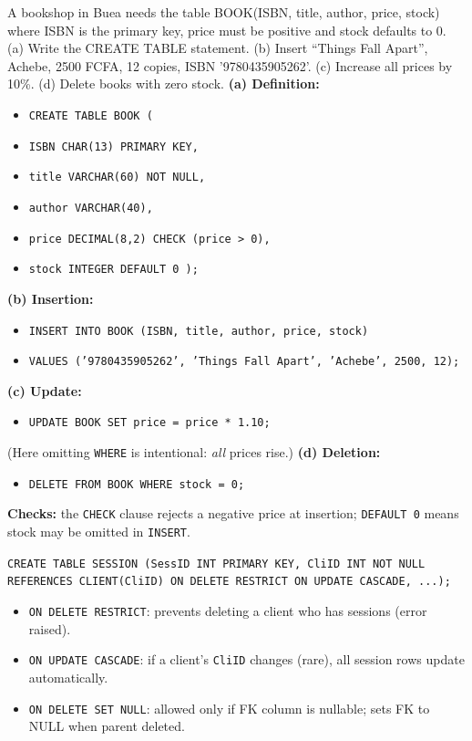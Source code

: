 \documentclass[11pt]{article}
\begin{document}
\begin{exoresolu}
A bookshop in Buea needs the table BOOK(ISBN, title, author, price, stock) where ISBN is the primary key, price must be positive and stock defaults to 0. (a) Write the CREATE TABLE statement. (b) Insert ``Things Fall Apart'', Achebe, 2500 FCFA, 12 copies, ISBN '9780435905262'. (c) Increase all prices by 10\%. (d) Delete books with zero stock.
\tcblower
\textbf{(a) Definition:}
\begin{itemize}
\item[] \texttt{CREATE TABLE BOOK (}
\item[] \texttt{\quad ISBN CHAR(13) PRIMARY KEY,}
\item[] \texttt{\quad title VARCHAR(60) NOT NULL,}
\item[] \texttt{\quad author VARCHAR(40),}
\item[] \texttt{\quad price DECIMAL(8,2) CHECK (price > 0),}
\item[] \texttt{\quad stock INTEGER DEFAULT 0 );}
\end{itemize}
\textbf{(b) Insertion:}
\begin{itemize}
\item[] \texttt{INSERT INTO BOOK (ISBN, title, author, price, stock)}
\item[] \texttt{VALUES ('9780435905262', 'Things Fall Apart', 'Achebe', 2500, 12);}
\end{itemize}
\textbf{(c) Update:}
\begin{itemize}
\item[] \texttt{UPDATE BOOK SET price = price * 1.10;}
\end{itemize}
(Here omitting \texttt{WHERE} is intentional: \emph{all} prices rise.)
\textbf{(d) Deletion:}
\begin{itemize}
\item[] \texttt{DELETE FROM BOOK WHERE stock = 0;}
\end{itemize}
\textbf{Checks:} the \texttt{CHECK} clause rejects a negative price at insertion; \texttt{DEFAULT 0} means stock may be omitted in \texttt{INSERT}.
\end{exoresolu}

\begin{exemplebox}
\texttt{CREATE TABLE SESSION (SessID INT PRIMARY KEY, CliID INT NOT NULL REFERENCES CLIENT(CliID) ON DELETE RESTRICT ON UPDATE CASCADE, ...);}
\begin{itemize}
\item \texttt{ON DELETE RESTRICT}: prevents deleting a client who has sessions (error raised).
\item \texttt{ON UPDATE CASCADE}: if a client's \texttt{CliID} changes (rare), all session rows update automatically.
\item \texttt{ON DELETE SET NULL}: allowed only if FK column is nullable; sets FK to NULL when parent deleted.
\end{itemize}
\end{exemplebox}
\end{document}

